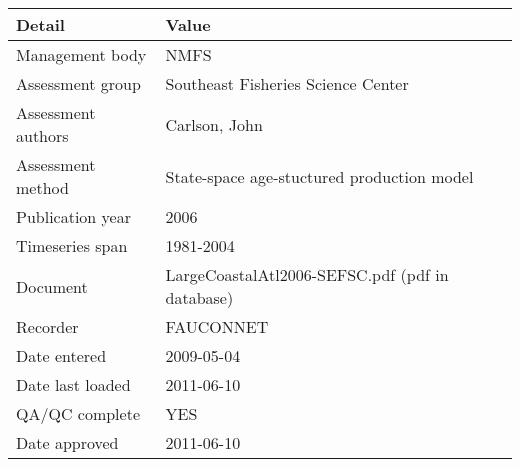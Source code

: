 \begin{table}[htb]
\centering
\begin{tabular}{lp{7cm}}
\toprule
Detail & Value \\
\midrule
Management body    & NMFS                                            \\
Assessment group   & Southeast Fisheries Science Center              \\
Assessment authors & Carlson, John                                   \\
Assessment method  & State-space age-stuctured production model      \\
Publication year   & 2006                                            \\
Timeseries span    & 1981-2004                                       \\
Document           & LargeCoastalAtl2006-SEFSC.pdf (pdf in database) \\
Recorder           & FAUCONNET                                       \\
Date entered       & 2009-05-04                                      \\
Date last loaded   & 2011-06-10                                      \\
QA/QC complete     & YES                                             \\
Date approved      & 2011-06-10                                      \\
\bottomrule
\end{tabular}
\label{tab:assessdet}
\end{table}
